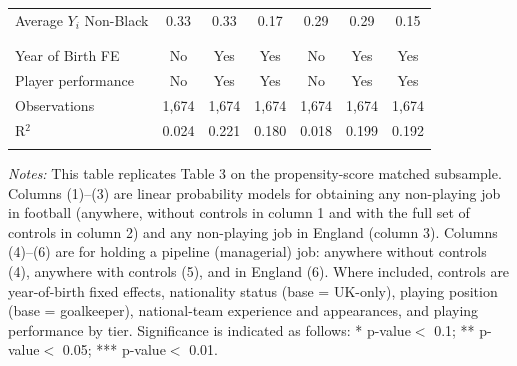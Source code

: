 \begin{table}[!h]
{\begin{threeparttable}
\begin{tabular}{@{\extracolsep{15pt}}lcccccc}
Average $Y_{i}$ Non-Black & 0.33 & 0.33 & 0.17 & 0.29 & 0.29 & 0.15 \\ 
  & & & & & & \\ 
\hline \\[-1.8ex]
Year of Birth FE & No & Yes & Yes & No & Yes & Yes \\
Player performance & No & Yes & Yes & No & Yes & Yes \\
Observations & 1,674 & 1,674 & 1,674 & 1,674 & 1,674 & 1,674 \\
R$^{2}$ & 0.024 & 0.221 & 0.180 & 0.018 & 0.199 & 0.192 \\
\hline
\hline \\[-1.8ex]
\end{tabular}
\begin{tablenotes}[flushleft]
		\item[] \scriptsize \textit{Notes:} This table replicates Table 3 on the propensity-score matched subsample. Columns (1)--(3) are linear probability models for obtaining any non-playing job in football (anywhere, without controls in column 1 and with the full set of controls in column 2) and any non-playing job in England (column 3). Columns (4)--(6) are for holding a pipeline (managerial) job: anywhere without controls (4), anywhere with controls (5), and in England (6). Where included, controls are year-of-birth fixed effects, nationality status (base = UK-only), playing position (base = goalkeeper), national-team experience and appearances, and playing performance by tier. Significance is indicated as follows: * p-value$<$ 0.1; ** p-value$<$ 0.05; *** p-value$<$ 0.01.
		\end{tablenotes}
  \end{threeparttable}
  }
\end{table}
